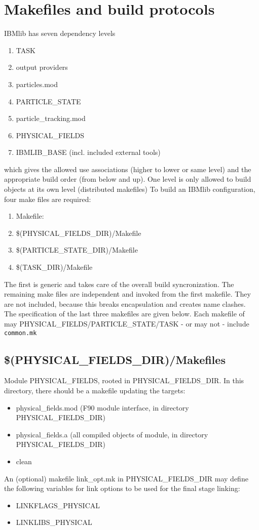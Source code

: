 \chapter{Makefiles and build protocols}


IBMlib has seven dependency levels
\begin{enumerate}
  \item TASK 
  \item output providers
  \item particles.mod
  \item PARTICLE\_STATE 
  \item particle\_tracking.mod
  \item PHYSICAL\_FIELDS 
  \item IBMLIB\_BASE (incl. included external tools)  
\end{enumerate}
which gives the allowed use associations (higher to lower or same level) 
and the appropriate build order (from below and up).
One level is only allowed to build objects at its own level (distributed makefiles)
To build an IBMlib configuration, four make files are required:
\begin{enumerate}
  \item Makefile:     
  \item \$(PHYSICAL\_FIELDS\_DIR)/Makefile
  \item \$(PARTICLE\_STATE\_DIR)/Makefile  
  \item \$(TASK\_DIR)/Makefile          
\end{enumerate}
The first is generic and takes care of the overall build syncronization.
The remaining make files are independent and invoked from the first makefile.
They are not included, because this breaks encapsulation and creates
name clashes. 
The specification of the last three makefiles are given below.
Each makefile of may PHYSICAL\_FIELDS/PARTICLE\_STATE/TASK 
- or may not - include {\tt common.mk}

\section{\$(PHYSICAL\_FIELDS\_DIR)/Makefiles }

Module PHYSICAL\_FIELDS, rooted in PHYSICAL\_FIELDS\_DIR. In this directory, there
should be a makefile updating the targets:
\begin{itemize}
  \item physical\_fields.mod (F90 module interface, in directory PHYSICAL\_FIELDS\_DIR)
  \item physical\_fields.a   (all compiled objects of module, in directory PHYSICAL\_FIELDS\_DIR)
  \item clean
\end{itemize}
An (optional) makefile link\_opt.mk in PHYSICAL\_FIELDS\_DIR may define the following 
variables for link options to be used for the final stage linking:
\begin{itemize}
  \item LINKFLAGS\_PHYSICAL
  \item LINKLIBS\_PHYSICAL 
\end{itemize}

